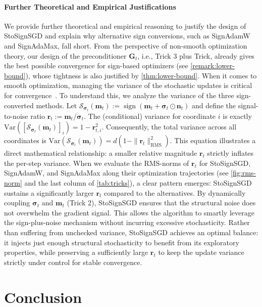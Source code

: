 \documentclass{article}
\def \r {\mathbf{r}}
\def \SS {\mathcal{S}}
\def \Gb {\mathbf{G}}
\def \m {\mathbf{m}}
\def \n {\mathbf{n}}
\DeclareMathOperator*{\sgn}{sign}
\newcommand{\sign}[1]{\sgn\left(#1\right)}
\def \bsigma {\bm{\sigma}}
\begin{document}
\paragraph{Further Theoretical and Empirical Justifications}
We provide further theoretical and empirical reasoning to justify the design of StoSignSGD and explain why alternative sign conversions, such as SignAdamW and SignAdaMax, fall short. From the perspective of non-smooth optimization theory, our design of the preconditioner $\Gb_t$, i.e., Trick 3 plus Trick, already gives the best possible convergence for sign-based optimizers (see \cref{remark:lower-bound}), whose tightness is also justified by \cref{thm:lower-bound}. 
When it comes to smooth optimization, managing the variance of the stochastic updates is critical for convergence~\citep{Bottou18optimization}. To understand this, we analyze the variance of the three sign-converted methods. Let $\SS_{\bsigma_t}(\m_t) := \sign{\m_t+\bsigma_t\odot\n_t}$ and define the signal-to-noise ratio $\r_t := \m_t/\bsigma_t$. The (conditional) variance for coordinate $i$ is exactly $\mathrm{Var}([\SS_{\bsigma_t}(\m_t)]_i) = 1-\r_{t,i}^2$. Consequently, the total variance across all coordinates is $\mathrm{Var}(\SS_{\bsigma_t}(\m_t)) = d(1-\|\r_t\|^2_{\text{RMS}})$. This equation illustrates a direct mathematical relationship: a smaller relative magnitude $\r_t$ strictly inflates the per-step variance. When we evaluate the RMS-norms of $\r_t$ for StoSignSGD, SignAdamW, and SignAdaMax along their optimization trajectories (see \cref{fig:rms-norm} and the last column of \cref{tab:tricks}), a clear pattern emerges: StoSignSGD sustains a significantly larger $\r_t$ compared to the alternatives. By dynamically coupling $\bsigma_t$ and $\m_t$ (Trick 2), StoSignSGD ensures that the structural noise does not overwhelm the gradient signal. This allows the algorithm to smartly leverage the sign-plus-noise mechanism without incurring excessive stochasticity. Rather than suffering from unchecked variance, StoSignSGD achieves an optimal balance: it injects just enough structural stochasticity to benefit from its exploratory properties, while preserving a sufficiently large $\r_t$ to keep the update variance strictly under control for stable convergence.

\section{Conclusion}
\end{document}
